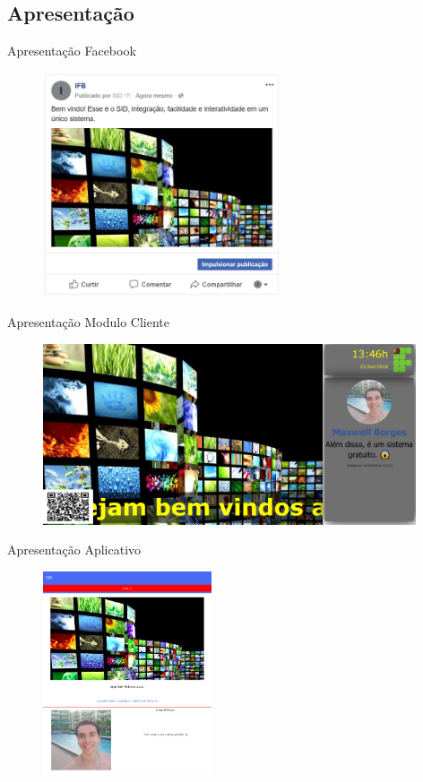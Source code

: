 \documentclass{aula-ifb}
\begin{document}
\subsection{Apresentação}
\begin{frame}{Apresentação Facebook}
\begin{figure}[h]
\includegraphics[width=7cm]{figuras/imgfacebook1.png}
\label{fig:facebookgraph}
\end{figure}
\end{frame}

\begin{frame}{Apresentação Modulo Cliente}
\begin{figure}[h]
\includegraphics[width=11cm]{figuras/funcionalidadeexibir.png}
\label{fig:facebookgraph}
\end{figure}
\end{frame}

\begin{frame}{Apresentação Aplicativo}
	\begin{figure}[h]
    	\includegraphics[height=6cm]{figuras/mobile1.png}
	\end{figure}
\end{frame}
\end{document}
